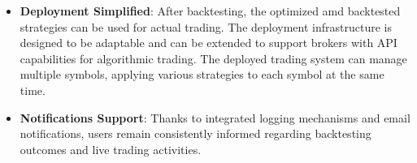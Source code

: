 \begin{itemize}
    \item \textbf{Deployment Simplified}: After backtesting, the optimized amd backtested strategies can be used for actual trading.
The deployment infrastructure is designed to be adaptable and can be extended to support brokers with API capabilities for algorithmic trading.
The deployed trading system can manage multiple symbols, applying various strategies to each symbol at the same time.

    \item \textbf{Notifications Support}: Thanks to integrated logging mechanisms and email notifications, users remain consistently informed regarding backtesting outcomes and live trading activities.
\end{itemize}



